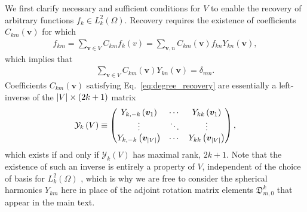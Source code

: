 \documentclass[nofootinbib,notitlepage,twocolumn]{revtex4-2}
\newcommand{\p}[1]{\left(#1\right)} %
\renewcommand{\v}{\bm} %
\newcommand{\1}{\mathds{1}}
\newcommand{\Y}{\mathcal{Y}}
\newcommand{\D}{\mathfrak{D}}
\begin{document}
We first clarify necessary and sufficient conditions for $V$ to enable the recovery of arbitrary functions $f_k\in L^2_k\p{\Omega}$.
Recovery requires the existence of coefficients $C_{km}\p{\v v}$ for which
\begin{align}
  f_{km} = \sum_{\v v\in V} C_{km} f_k\p{v}
  = \sum_{\v v,n} C_{km}\p{\v v} f_{kn} Y_{kn}\p{\v v},
\end{align}
which implies that
\begin{align}
  \sum_{\v v\in V} C_{km}\p{\v v} Y_{kn}\p{\v v} = \delta_{mn}.
  \label{eq:degree_recovery}
\end{align}
Coefficients $C_{km}\p{\v v}$ satisfying Eq.~\eqref{eq:degree_recovery} are essentially a left-inverse of the $\abs{V}\times\p{2k+1}$ matrix
\begin{align}
  \Y_k\p{V} \equiv
  \begin{pmatrix}
    Y_{k,-k}\p{\v v_1} & \cdots & Y_{kk}\p{\v v_1} \\
    \vdots & \ddots & \vdots \\
    Y_{k,-k}\p{\v v_{\abs{V}}} & \cdots & Y_{kk}\p{\v v_{\abs{V}}}
  \end{pmatrix},
\end{align}
which exists if and only if $\Y_k\p{V}$ has maximal rank, $2k+1$.
Note that the existence of such an inverse is entirely a property of $V$, independent of the choice of basis for $L^2_k\p{\Omega}$ \cite{freeden2008spherical}, which is why we are free to consider the spherical harmonics $Y_{km}$ here in place of the adjoint rotation matrix elements $\D^k_{m,0}$ that appear in the main text.
\end{document}
